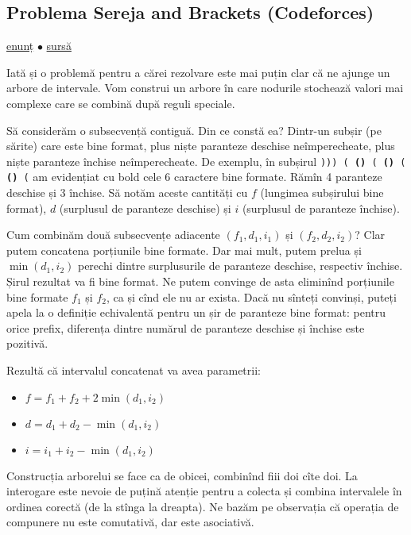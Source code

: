 \subsection{Problema Sereja and Brackets (Codeforces)}

\href{https://codeforces.com/contest/380/problem/C}{enunț}
$\bullet$
\href{https://codeforces.com/contest/380/submission/280972559}{sursă}

Iată și o problemă pentru a cărei rezolvare este mai puțin clar că ne ajunge un arbore de intervale. Vom construi un arbore în care nodurile stochează valori mai complexe care se combină după reguli speciale.

Să considerăm o subsecvență contiguă. Din ce constă ea? Dintr-un subșir (pe sărite) care este bine format, plus niște paranteze deschise neîmperecheate, plus niște paranteze închise neîmperecheate. De exemplu, în subșirul \texttt{))) ( \textbf{()} ( \textbf{()} ( \textbf{()} (} am evidențiat cu bold cele 6 caractere bine formate. Rămîn 4 paranteze deschise și 3 închise. Să notăm aceste cantități cu $f$ (lungimea subșirului bine format), $d$ (surplusul de paranteze deschise) și $i$ (surplusul de paranteze închise).

Cum combinăm două subsecvențe adiacente $(f_1, d_1, i_1)$ și $(f_2, d_2, i_2)$? Clar putem concatena porțiunile bine formate. Dar mai mult, putem prelua și $\min(d_1, i_2)$ perechi dintre surplusurile de paranteze deschise, respectiv închise. Șirul rezultat va fi bine format. Ne putem convinge de asta eliminînd porțiunile bine formate $f_1$ și $f_2$, ca și cînd ele nu ar exista. Dacă nu sînteți convinși, puteți apela la o definiție echivalentă pentru un șir de paranteze bine format: pentru orice prefix, diferența dintre numărul de paranteze deschise și închise este pozitivă.

Rezultă că intervalul concatenat va avea parametrii:


\begin{itemize}
  \item $f = f_1 + f_2 + 2 \min(d_1, i_2)$
  \item $d = d_1 + d_2 - \min(d_1, i_2)$
  \item $i = i_1 + i_2 - \min(d_1, i_2)$
\end{itemize}

Construcția arborelui se face ca de obicei, combinînd fiii doi cîte doi. La interogare este nevoie de puțină atenție pentru a colecta și combina intervalele în ordinea corectă (de la stînga la dreapta). Ne bazăm pe observația că operația de compunere nu este comutativă, dar este asociativă.

